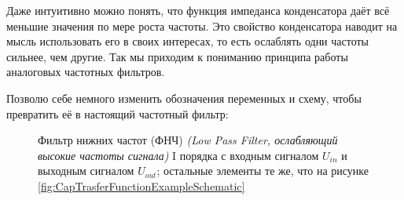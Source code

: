 \documentclass[a4paper, 10pt, final]{article} %
\begin{document}
    Даже интуитивно можно понять, что функция импеданса конденсатора даёт всё меньшие значения по мере роста частоты.
    Это свойство конденсатора наводит на мысль использовать его в своих интересах, то есть ослаблять одни частоты сильнее, чем другие.
    Так мы приходим к пониманию принципа работы аналоговых частотных фильтров.

    Позволю себе немного изменить обозначения переменных и схему, чтобы превратить её в настоящий частотный фильтр:
    \begin{figure}[H]
        \centering
        \caption{Фильтр нижних частот (ФНЧ) \emph{(Low Pass Filter, ослабляющий высокие частоты сигнала)} I порядка с входным сигналом $U_{in}$ и выходным сигналом $U_{out}$; остальные элементы те же, что на рисунке \ref{fig:CapTrasferFunctionExampleSchematic}}
        \label{fig:CapFilterExample}
    \end{figure}
\end{document}
